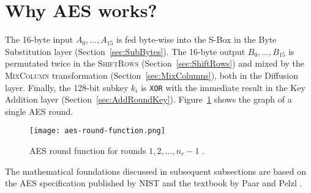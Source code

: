 \section{Why AES works?}
\label{sec:why}
\label{sec:math}

The 16-byte input $A_0, \dots, A_{15}$ is fed byte-wise into the S-Box in the Byte Substitution layer (Section~\ref{sec:SubBytes}).
The 16-byte output $B_0, \dots, B_{15}$ is permutated twice in the \textsc{ShiftRows} (Section~\ref{sec:ShiftRows}) and mixed by the \textsc{MixColumn} transformation (Section~\ref{sec:MixColumns}), both in the Diffusion layer.
Finally, the 128-bit subkey $k_i$ is \texttt{XOR} with the immediate result in the Key Addition layer (Section~\ref{sec:AddRoundKey}).
Figure~\ref{fig:aes-round-function} shows the graph of a single AES round. 

\begin{figure}[!ht]
    \centering
    \texttt{[image: aes-round-function.png]}
    \caption{
        AES round function for rounds $1, 2, \dots, n_r-1$ \cite{Paar2024}.
    }
    \label{fig:aes-round-function}
\end{figure}

The mathematical foundations discussed in subsequent subsections are based on the \gls{AES} specification published by \gls{NIST} \cite{NIST_AES} and the textbook by Paar and Pelzl \cite{Paar2024}.









